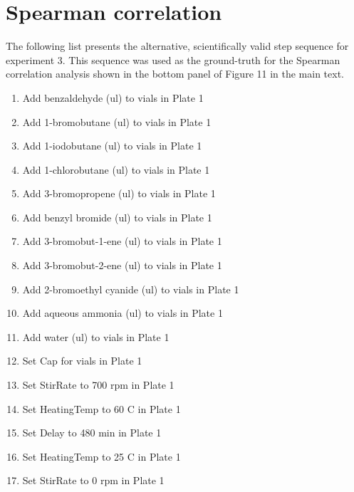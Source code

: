 \documentclass[sn-nature, twocolumn]{sn-jnl}%
\theoremstyle{thmstyleone}%
\theoremstyle{thmstyletwo}%
\theoremstyle{thmstylethree}%
\begin{document}
\clearpage
\section{Spearman correlation}

The following list presents the alternative, scientifically valid step sequence for experiment 3. This sequence was used as the ground-truth for the Spearman correlation analysis shown in the bottom panel of Figure 11 in the main text. 




\begin{enumerate}[itemsep=0pt]
    \item Add benzaldehyde (ul) to vials in Plate 1
    \item Add 1-bromobutane (ul) to vials in Plate 1
    \item Add 1-iodobutane (ul) to vials in Plate 1
    \item Add 1-chlorobutane (ul) to vials in Plate 1
    \item Add 3-bromopropene (ul) to vials in Plate 1
    \item Add benzyl bromide (ul) to vials in Plate 1
    \item Add 3-bromobut-1-ene (ul) to vials in Plate 1
    \item Add 3-bromobut-2-ene (ul) to vials in Plate 1
    \item Add 2-bromoethyl cyanide (ul) to vials in Plate 1
    \item Add aqueous ammonia (ul) to vials in Plate 1
    \item Add water (ul) to vials in Plate 1
    \item Set Cap for vials in Plate 1
    \item Set StirRate to 700 rpm in Plate 1
    \item Set HeatingTemp to 60 C in Plate 1
    \item Set Delay to 480 min in Plate 1
    \item Set HeatingTemp to 25 C in Plate 1
    \item Set StirRate to 0 rpm in Plate 1
\end{enumerate}
\end{document}
